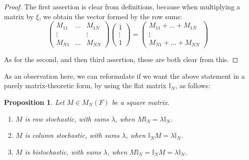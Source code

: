 \documentclass[12pt]{amsbook}
\newtheorem{proposition}[theorem]{Proposition}
\begin{document}
\begin{proof}
The first assertion is clear from definitions, because when multiplying a matrix by $\xi$, we obtain the vector formed by the row sums:
$$\begin{pmatrix}
M_{11}&\ldots&M_{1N}\\
\vdots&&\vdots\\
M_{N1}&\ldots&M_{NN}
\end{pmatrix}
\begin{pmatrix}
1\\
\vdots\\
1
\end{pmatrix}
=\begin{pmatrix}
M_{11}+\ldots+M_{1N}\\
\vdots\\
M_{N1}+\ldots+M_{NN}
\end{pmatrix}$$

As for the second, and then third assertion, these are both clear from this.
\end{proof}

As an observation here, we can reformulate if we want the above statement in a purely matrix-theoretic form, by using the flat matrix $\mathbb I_N$, as follows:


\begin{proposition}
Let $M\in M_N(F)$ be a square matrix.
\begin{enumerate}
\item $M$ is row stochastic, with sums $\lambda$, when $M\mathbb I_N=\lambda\mathbb I_N$.

\item $M$ is column stochastic, with sums $\lambda$, when $\mathbb I_NM=\lambda\mathbb I_N$.

\item $M$ is bistochastic, with sums $\lambda$, when $M\mathbb I_N=\mathbb I_NM=\lambda\mathbb I_N$.
\end{enumerate}
\end{proposition}
\end{document}
